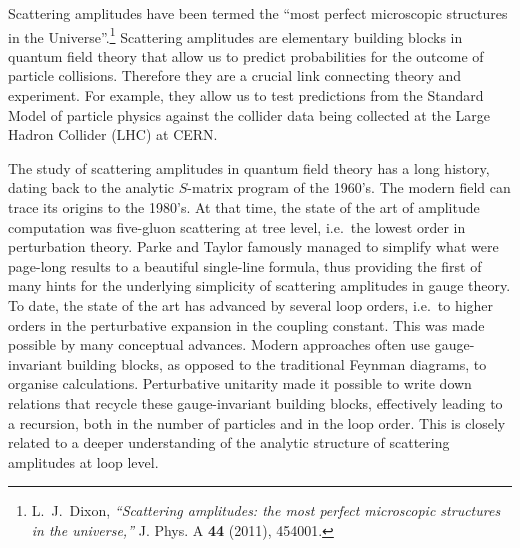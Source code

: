 \preface

Scattering amplitudes have been termed the ``most perfect microscopic structures in the Universe''.\footnote{L.~J.~Dixon,
{\it ``Scattering amplitudes: the most perfect microscopic structures in the universe,''}
J. Phys. A \textbf{44} (2011), 454001.} 
Scattering amplitudes are elementary building blocks in quantum field theory that allow us to predict probabilities for the outcome of particle collisions. 
Therefore they are a crucial link connecting theory and experiment. For example, they allow us to test predictions from the Standard Model of particle physics against the collider data being collected at the Large Hadron Collider (LHC) at CERN. 


\smallskip
The study of scattering amplitudes in quantum field theory has a long history,
dating back to the analytic $S$-matrix program of the 1960's. The modern field can trace its
origins to the 1980's. At that time, the state of the art of amplitude
computation was five-gluon scattering at tree level, i.e.\ the lowest order in
perturbation theory. Parke and Taylor famously managed to simplify what were
page-long results to a beautiful single-line formula, thus providing the first
of many hints for the underlying simplicity of scattering amplitudes in gauge
theory. To date, the state of the art has advanced by several loop orders,
i.e.\ to higher orders in the perturbative expansion in the coupling constant.
This was made possible by many conceptual advances. Modern approaches often use
gauge-invariant building blocks, as opposed to the traditional Feynman
diagrams, to organise calculations.
%
Perturbative unitarity made it possible to write down relations that recycle
these gauge-invariant building blocks, effectively leading to a recursion, both
in the number of particles and in the loop order. This is closely related to a
deeper understanding of the analytic structure of scattering amplitudes at loop level.

 \smallskip 
 
